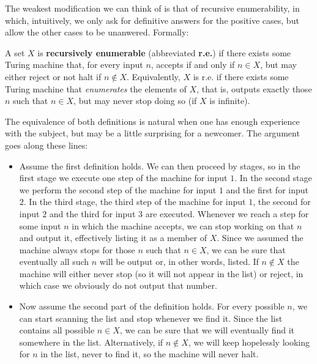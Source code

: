 \documentclass[../main.tex]{memoir}
\begin{document}
The weakest modification we can think of is that of recursive enumerability, in which, intuitively, we only ask for definitive answers for the positive cases, but allow the other cases to be unanwered. Formally:

\begin{definition}
  A set $X$ is \textbf{recursively enumerable} (abbreviated \textbf{r.e.}) if there exists some Turing machine that, for every input $n$, accepts if and only if $n \in X$, but may either reject or not halt if $n \not\in X$. Equivalently, $X$ is r.e. if there exists some Turing machine that \textit{enumerates} the elements of $X$, that is, outputs exactly those $n$ such that $n \in X$, but may never stop doing so (if $X$ is infinite).
\end{definition}

\begin{remark}
  \label{remark:re-equivalence}
  The equivalence of both definitions is natural when one has enough experience with the subject, but may be a little surprising for a newcomer. The argument goes along these lines:

  \begin{itemize}
  \item Assume the first definition holds. We can then proceed by stages, so in the first stage we execute one step of the machine for input $1$. In the second stage we perform the second step of the machine for input $1$ and the first for input $2$. In the third stage, the third step of the machine for input $1$, the second for input $2$ and the third for input $3$ are executed. Whenever we reach a step for some input $n$ in which the machine accepts, we can stop working on that $n$ and output it, effectively listing it as a member of $X$. Since we assumed the machine always stops for those $n$ such that $n \in X$, we can be sure that eventually all such $n$ will be output or, in other words, listed. If $n \not\in X$ the machine will either never stop (so it will not appear in the list) or reject, in which case we obviously do not output that number.
  \item Now assume the second part of the definition holds. For every possible $n$, we can start scanning the list and stop whenever we find it. Since the list contains all possible $n \in X$, we can be sure that we will eventually find it somewhere in the list. Alternatively, if $n \not\in X$, we will keep hopelessly looking for $n$ in the list, never to find it, so the machine will never halt.
  \end{itemize}


\end{remark}
\end{document}
